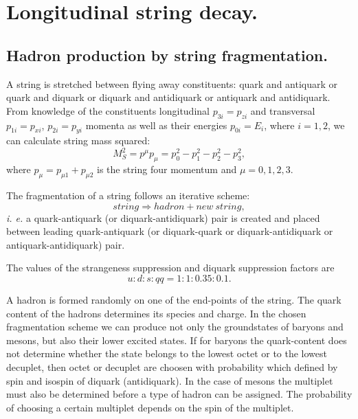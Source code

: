 \section{Longitudinal string decay.}

\subsection{Hadron production by string fragmentation.}
\hspace{1.0em}A string is stretched between flying away constituents:
quark and antiquark or quark and diquark or diquark and antidiquark or
antiquark and antidiquark.  From knowledge of the constituents
longitudinal $p_{3i}=p_{zi}$ and transversal $p_{1i}=p_{xi}$,
$p_{2i}=p_{yi}$ momenta as well as their energies $p_{0i} = E_{i}$,
where $i=1,2$, we can calculate string mass squared:
\begin{equation}
\label{LSD1} M^2_S=p^{\mu}p_{\mu}=p^2_0-p^2_1-p^2_2-p^2_3,
\end{equation}
where $p_{\mu} = p_{\mu 1}+p_{\mu 2}$ is the string four momentum and 
 $\mu = 0,1,2,3$. 
 
The fragmentation of a string follows an iterative scheme:
\begin{equation}
string \Rightarrow hadron + new \ string,
\end{equation}
\textit{i. e.} a quark-antiquark (or diquark-antidiquark) pair is
created and placed between leading quark-antiquark (or diquark-quark or
diquark-antidiquark or antiquark-antidiquark) pair.

The values of the strangeness suppression and diquark suppression
factors are
\begin{equation}
\label{LSD2} u:d:s:qq = 1:1:0.35:0.1.
\end{equation}

A hadron is formed randomly on one of the end-points of the string. The
quark content of the hadrons determines its species and charge.  In the
chosen fragmentation scheme we can produce not only the groundstates of
baryons and mesons, but also their lower excited states.  If for baryons the
quark-content does not determine whether the state belongs to the lowest
octet or to the lowest decuplet, then octet or decuplet are choosen with
probability which defined by spin and isospin of diquark (antidiquark).
 In the case
of mesons the multiplet must also be determined before a type of hadron
can be assigned. The probability of choosing a certain multiplet depends
on the spin of the multiplet.

